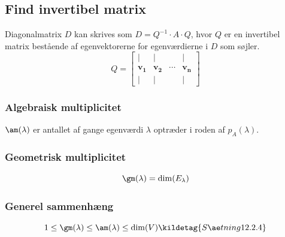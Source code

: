 
\subsection{Find invertibel matrix}
\label{sec:invertibel_matrix}
Diagonalmatrix $D$ kan skrives som $D = Q^{-1} \cdot A \cdot Q$, hvor $Q$ er en invertibel matrix bestående af egenvektorerne for egenværdierne i $D$ som søjler.
\[Q =
\begin{bmatrix}
    | & | & & | \\
    \mathbf{v_1} & \mathbf{v_2} & \cdots & \mathbf{v_n} \\
    | & | & & |
\end{bmatrix}\]



\subsubsection{Algebraisk multiplicitet}
$\am(\lambda)$ er antallet af gange egenværdi $\lambda$ optræder i roden af $p_A(\lambda)$.


\subsubsection{Geometrisk multiplicitet}
\[\gm(\lambda) = \dim(E_\lambda)\]


\subsubsection{Generel sammenhæng}
\[
1 \le \gm(\lambda) \le \am(\lambda) \le \dim(V)
\kildetag{Sætning 12.2.4}
\]

